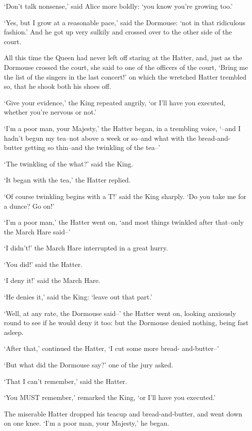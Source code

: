 \documentclass[12pt]{book}
\begin{document}
  `Don't talk nonsense,' said Alice more boldly:  `you know
you're growing too.'

  `Yes, but I grow at a reasonable pace,' said the Dormouse:
`not in that ridiculous fashion.'  And he got up very sulkily
and crossed over to the other side of the court.

  All this time the Queen had never left off staring at the
Hatter, and, just as the Dormouse crossed the court, she said to
one of the officers of the court, `Bring me the list of the
singers in the last concert!' on which the wretched Hatter
trembled so, that he shook both his shoes off.

  `Give your evidence,' the King repeated angrily, `or I'll have
you executed, whether you're nervous or not.'

  `I'm a poor man, your Majesty,' the Hatter began, in a
trembling voice, `--and I hadn't begun my tea--not above a week
or so--and what with the bread-and-butter getting so thin--and
the twinkling of the tea--'

  `The twinkling of the what?' said the King.

  `It began with the tea,' the Hatter replied.

  `Of course twinkling begins with a T!' said the King sharply.
`Do you take me for a dunce?  Go on!'

  `I'm a poor man,' the Hatter went on, `and most things
twinkled after that--only the March Hare said--'

  `I didn't!' the March Hare interrupted in a great hurry.

  `You did!' said the Hatter.

  `I deny it!' said the March Hare.

  `He denies it,' said the King:  `leave out that part.'

  `Well, at any rate, the Dormouse said--' the Hatter went on,
looking anxiously round to see if he would deny it too:  but the
Dormouse denied nothing, being fast asleep.

  `After that,' continued the Hatter, `I cut some more bread-
and-butter--'

  `But what did the Dormouse say?' one of the jury asked.

  `That I can't remember,' said the Hatter.

  `You MUST remember,' remarked the King, `or I'll have you
executed.'

  The miserable Hatter dropped his teacup and bread-and-butter,
and went down on one knee.  `I'm a poor man, your Majesty,' he
began.
\end{document}
